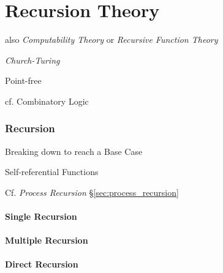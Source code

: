 \part{Recursion Theory}\label{part:recursion_theory}\cite{czoo14}

also \emph{Computability Theory} or \emph{Recursive Function Theory}

\emph{Church-Turing}

Point-free

\fist cf. Combinatory Logic



\section{Recursion}\label{sec:recursion}

Breaking down to reach a Base Case

Self-referential Functions

\fist Cf. \emph{Process Recursion} \S\ref{sec:process_recursion}



\subsection{Single Recursion}\label{sec:single_recursion}

\subsection{Multiple Recursion}\label{sec:multiple_recursion}

\subsection{Direct Recursion}\label{sec:direct_recursion}

